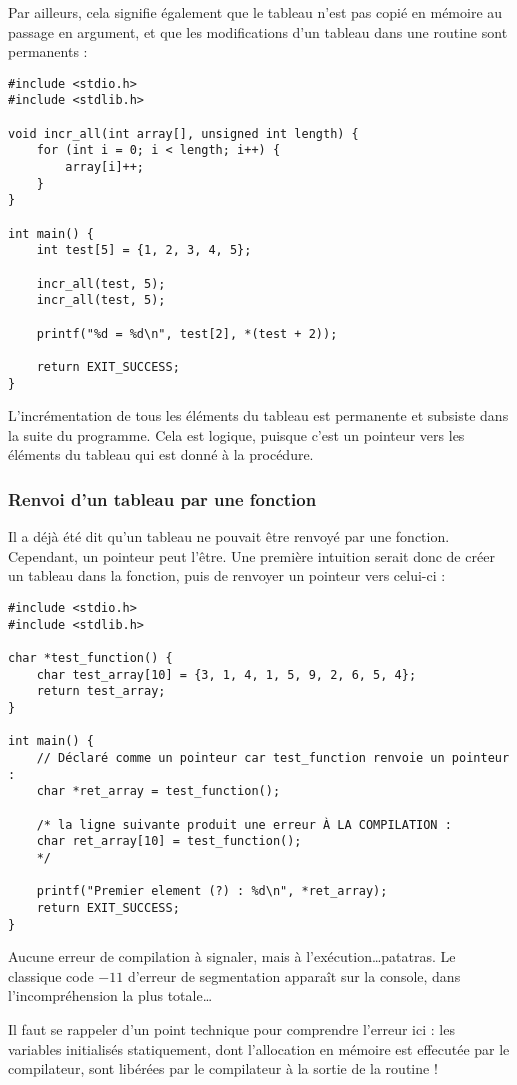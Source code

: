 \documentclass[../../../main.tex]{subfiles}
\begin{document}
Par ailleurs, cela signifie également que le tableau n'est pas copié en mémoire au passage en argument, et que les modifications d'un tableau dans une routine sont permanents :
\begin{verbatim}
#include <stdio.h>
#include <stdlib.h>

void incr_all(int array[], unsigned int length) {
	for (int i = 0; i < length; i++) {
		array[i]++;
	}
}

int main() {
	int test[5] = {1, 2, 3, 4, 5};
	
	incr_all(test, 5);
	incr_all(test, 5);

	printf("%d = %d\n", test[2], *(test + 2)); 

	return EXIT_SUCCESS;
}
\end{verbatim}
L'incrémentation de tous les éléments du tableau est permanente et subsiste dans la suite du programme. Cela est logique, puisque c'est un pointeur vers les éléments du tableau qui est donné à la procédure.
\subsubsection{Renvoi d'un tableau par une fonction}
Il a déjà été dit qu'un tableau ne pouvait être renvoyé par une fonction. Cependant, un pointeur peut l'être. Une première intuition serait donc de créer un tableau dans la fonction, puis de renvoyer un pointeur vers celui-ci :
\begin{verbatim}
#include <stdio.h>
#include <stdlib.h>

char *test_function() {
	char test_array[10] = {3, 1, 4, 1, 5, 9, 2, 6, 5, 4};
	return test_array;
}

int main() {
	// Déclaré comme un pointeur car test_function renvoie un pointeur :
	char *ret_array = test_function();
	
	/* la ligne suivante produit une erreur À LA COMPILATION :
	char ret_array[10] = test_function();
	*/
	
	printf("Premier element (?) : %d\n", *ret_array);
	return EXIT_SUCCESS;
}
\end{verbatim}
Aucune erreur de compilation à signaler, mais à l'exécution\dots patatras. Le classique code $-11$ d'erreur de segmentation apparaît sur la console, dans l'incompréhension la plus totale\dots
 
Il faut se rappeler d'un point technique pour comprendre l'erreur ici : les variables initialisés statiquement, dont l'allocation en mémoire est effecutée par le compilateur, sont libérées par le compilateur à la sortie de la routine !
 
\end{document}

